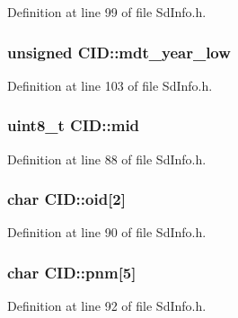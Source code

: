 Definition at line 99 of file Sd\+Info.\+h.

\subsubsection[{\texorpdfstring{mdt\+\_\+year\+\_\+low}{mdt\_year\_low}}]{\setlength{\rightskip}{0pt plus 5cm}unsigned C\+I\+D\+::mdt\+\_\+year\+\_\+low}\hypertarget{struct_c_i_d_ac36633e5eef5d901fe999aad7862508b}{}\label{struct_c_i_d_ac36633e5eef5d901fe999aad7862508b}


Definition at line 103 of file Sd\+Info.\+h.

\subsubsection[{\texorpdfstring{mid}{mid}}]{\setlength{\rightskip}{0pt plus 5cm}uint8\+\_\+t C\+I\+D\+::mid}\hypertarget{struct_c_i_d_addb3f98dd20ccc0ffdf300d5ef9c6333}{}\label{struct_c_i_d_addb3f98dd20ccc0ffdf300d5ef9c6333}


Definition at line 88 of file Sd\+Info.\+h.

\subsubsection[{\texorpdfstring{oid}{oid}}]{\setlength{\rightskip}{0pt plus 5cm}char C\+I\+D\+::oid\mbox{[}2\mbox{]}}\hypertarget{struct_c_i_d_a12cb950aa46c62c8af1e530006f97031}{}\label{struct_c_i_d_a12cb950aa46c62c8af1e530006f97031}


Definition at line 90 of file Sd\+Info.\+h.

\subsubsection[{\texorpdfstring{pnm}{pnm}}]{\setlength{\rightskip}{0pt plus 5cm}char C\+I\+D\+::pnm\mbox{[}5\mbox{]}}\hypertarget{struct_c_i_d_a6484cd56fc4bacfa815c12d8682129ba}{}\label{struct_c_i_d_a6484cd56fc4bacfa815c12d8682129ba}


Definition at line 92 of file Sd\+Info.\+h.

